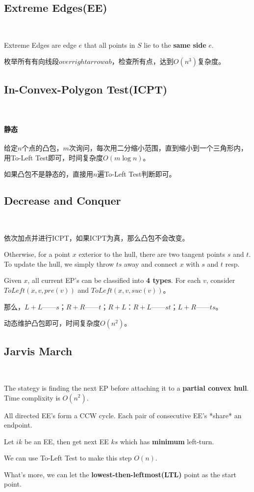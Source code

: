\documentclass[12pt]{article}
\begin{document}
\begin{CJK*}{GBK}{song}
        \subsection{Extreme Edges(EE)}\
            \par Extreme Edges are edge $e$ that all points in $S$ lie to the \textbf{same side} $e$.
            \par 枚举所有有向线段$overrightarrow{ab}$，检查所有点，达到$O(n^3)$复杂度。
        \subsection{In-Convex-Polygon Test(ICPT)}\
            \paragraph{静态}给定$n$个点的凸包，$m$次询问，每次用二分缩小范围，直到缩小到一个三角形内，用To-Left Test即可，时间复杂度$O(m\log n)$。
            \par 如果凸包不是静态的，直接用$n$遍To-Left Test判断即可。
        \subsection{Decrease and Conquer}\
            \par 依次加点并进行ICPT，如果ICPT为真，那么凸包不会改变。
            \par Otherwise, for a point $x$ exterior to the hull, there are two tangent points $s$ and $t$. To update the hull, we simply throw $ts$ away and connect $x$ with $s$ and $t$ resp.
            \par Given $x$, all current EP's can be classified into \textbf{4 types}. For each $v$, consider $ToLeft(x,v,pre(v))$ and $ToLeft(x,v,suc(v))$。
            \par 那么，$L+L$——$s$；$R+R$——$t$；$R+L$：$R+L$——$st$；$L+R$——$ts$。
            \par 动态维护凸包即可，时间复杂度$O(n^2)$。
        \subsection{Jarvis March}\
            \par The stategy is finding the next EP before attaching it to a \textbf{partial convex hull}. Time complixity is $O(n^2)$.
            \par All directed EE's form a CCW cycle. Each pair of consecutive EE's *share* an endpoint.
            \par Let $ik$ be an EE, then get next EE $ks$ which has \textbf{minimum} left-turn.
            \par We can use To-Left Test to make this step $O(n)$.
            \par What's more, we can let the \textbf{lowest-then-leftmost(LTL)} point as the start point.

\end{CJK*}
\end{document}
